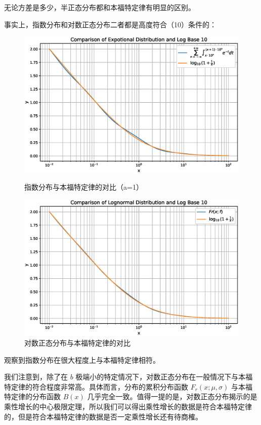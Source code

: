 \documentclass{ctexart} %
\begin{document}
无论方差是多少，半正态分布都和本福特定律有明显的区别。

事实上，指数分布和对数正态分布二者都是高度符合（10）条件的：

\begin{figure}[H]
    \begin{minipage}{0.48\textwidth}
        \includegraphics[width=\textwidth]{exp.eps}
        \caption{指数分布与本福特定律的对比（a=1）}
    \end{minipage}
    \hfill
    \begin{minipage}{0.48\textwidth}
        \includegraphics[width=\textwidth]{log.eps}
        \caption{对数正态分布与本福特定律的对比}
    \end{minipage}
\end{figure}

观察到指数分布在很大程度上与本福特定律相符。

我们注意到，除了在 $ b $ 极端小的特定情况下，对数正态分布在一般情况下与本福特定律的符合程度非常高。具体而言，分布的累积分布函数 $ F_r(x; \mu, \sigma) $ 与本福特定律的分布函数 $ B(x) $ 几乎完全一致。值得一提的是，对数正态分布揭示的是乘性增长的中心极限定理，所以我们可以得出乘性增长的数据是符合本福特定律的，但是符合本福特定律的数据是否一定乘性增长还有待商榷。
\end{document}
